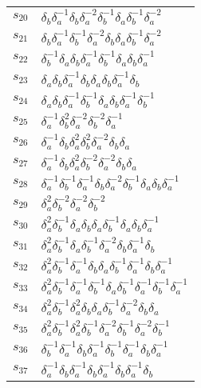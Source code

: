 \documentclass{article}
\begin{document}
\begin{center}
\begin{tabular}{ll}
$s_{20}$ & $\delta_b^{}\delta_a^{-1}\delta_b^{}\delta_a^{-2}\delta_b^{-1}\delta_a^{}\delta_b^{-1}\delta_a^{-2}$ \\
$s_{21}$ & $\delta_b^{}\delta_a^{-1}\delta_b^{-1}\delta_a^{-2}\delta_b^{}\delta_a^{}\delta_b^{-1}\delta_a^{-2}$ \\
$s_{22}$ & $\delta_b^{-1}\delta_a^{}\delta_b^{}\delta_a^{-1}\delta_b^{-1}\delta_a^{}\delta_b^{}\delta_a^{-1}$ \\
$s_{23}$ & $\delta_a^{}\delta_b^{}\delta_a^{-1}\delta_b^{}\delta_a^{}\delta_b^{}\delta_a^{-1}\delta_b^{}$ \\
$s_{24}$ & $\delta_a^{}\delta_b^{}\delta_a^{-1}\delta_b^{-1}\delta_a^{}\delta_b^{}\delta_a^{-1}\delta_b^{-1}$ \\
$s_{25}$ & $\delta_a^{-1}\delta_b^{2}\delta_a^{-2}\delta_b^{-2}\delta_a^{-1}$ \\
$s_{26}$ & $\delta_a^{-1}\delta_b^{}\delta_a^{2}\delta_b^{2}\delta_a^{-2}\delta_b^{}\delta_a^{}$ \\
$s_{27}$ & $\delta_a^{-1}\delta_b^{}\delta_a^{2}\delta_b^{-2}\delta_a^{-2}\delta_b^{}\delta_a^{}$ \\
$s_{28}$ & $\delta_a^{-1}\delta_b^{-1}\delta_a^{-1}\delta_b^{}\delta_a^{-2}\delta_b^{-1}\delta_a^{}\delta_b^{}\delta_a^{-1}$ \\
$s_{29}$ & $\delta_a^{2}\delta_b^{-2}\delta_a^{-2}\delta_b^{-2}$ \\
$s_{30}$ & $\delta_a^{2}\delta_b^{-1}\delta_a^{}\delta_b^{}\delta_a^{}\delta_b^{-1}\delta_a^{}\delta_b^{}\delta_a^{-1}$ \\
$s_{31}$ & $\delta_a^{2}\delta_b^{-1}\delta_a^{}\delta_b^{-1}\delta_a^{-2}\delta_b^{}\delta_a^{-1}\delta_b^{}$ \\
$s_{32}$ & $\delta_a^{2}\delta_b^{-1}\delta_a^{-1}\delta_b^{}\delta_a^{}\delta_b^{-1}\delta_a^{-1}\delta_b^{}\delta_a^{-1}$ \\
$s_{33}$ & $\delta_a^{2}\delta_b^{-1}\delta_a^{-1}\delta_b^{-1}\delta_a^{}\delta_b^{-1}\delta_a^{-1}\delta_b^{-1}\delta_a^{-1}$ \\
$s_{34}$ & $\delta_a^{2}\delta_b^{-1}\delta_a^{2}\delta_b^{}\delta_a^{}\delta_b^{-1}\delta_a^{-2}\delta_b^{}\delta_a^{}$ \\
$s_{35}$ & $\delta_a^{2}\delta_b^{-1}\delta_a^{2}\delta_b^{-1}\delta_a^{-2}\delta_b^{-1}\delta_a^{-2}\delta_b^{-1}$ \\
$s_{36}$ & $\delta_b^{-1}\delta_a^{-1}\delta_b^{}\delta_a^{-1}\delta_b^{-1}\delta_a^{-1}\delta_b^{}\delta_a^{-1}$ \\
$s_{37}$ & $\delta_a^{-1}\delta_b^{}\delta_a^{-1}\delta_b^{}\delta_a^{-1}\delta_b^{}\delta_a^{-1}\delta_b^{}$ \\

\end{tabular}
\end{center}
\end{document}
